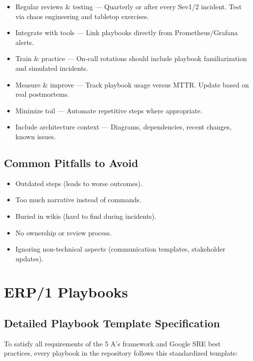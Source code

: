 \documentclass{article}
\begin{document}
\begin{itemize}
    \item Regular reviews \& testing — Quarterly or after every Sev1/2 incident. Test via chaos engineering and tabletop exercises.
    \item Integrate with tools — Link playbooks directly from Prometheus/Grafana alerts.
    \item Train \& practice — On-call rotations should include playbook familiarization and simulated incidents.
    \item Measure \& improve — Track playbook usage versus MTTR. Update based on real postmortems.
    \item Minimize toil — Automate repetitive steps where appropriate.
    \item Include architecture context — Diagrams, dependencies, recent changes, known issues.
\end{itemize}

\subsection{Common Pitfalls to Avoid}

\begin{itemize}
    \item Outdated steps (leads to worse outcomes).
    \item Too much narrative instead of commands.
    \item Buried in wikis (hard to find during incidents).
    \item No ownership or review process.
    \item Ignoring non-technical aspects (communication templates, stakeholder updates).
\end{itemize}

\section{ERP/1 Playbooks}

\subsection{Detailed Playbook Template Specification}

To satisfy all requirements of the 5 A’s framework and Google SRE best practices,
every playbook in the repository follows this standardized template:
\end{document}
